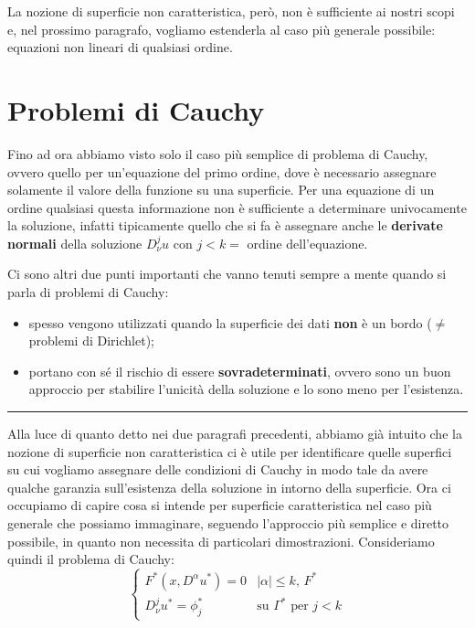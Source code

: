 La nozione di superficie non caratteristica, però, non è sufficiente ai nostri scopi e, nel prossimo paragrafo, vogliamo estenderla al caso più generale possibile: equazioni non lineari di qualsiasi ordine.

\newpage
\section{Problemi di Cauchy} \label{pb}

Fino ad ora abbiamo visto solo il caso più semplice di problema di Cauchy, ovvero quello per un'equazione del primo ordine, dove è necessario assegnare solamente il valore della funzione su una superficie. Per una equazione di un ordine qualsiasi questa informazione non è sufficiente a determinare univocamente la soluzione, infatti tipicamente quello che si fa è assegnare anche le \textbf{derivate normali} della soluzione $D^j_\nu u$ con $j<k=$ ordine dell'equazione. 

Ci sono altri due punti importanti che vanno tenuti sempre a mente quando si parla di problemi di Cauchy:
\begin{itemize}
\item spesso vengono utilizzati quando la superficie dei dati \textbf{non} è un bordo ($\neq$ problemi di Dirichlet);
\item portano con sé il rischio di essere \textbf{sovradeterminati}, ovvero sono un buon approccio per stabilire l'unicità della soluzione e lo sono meno per l'esistenza.
\end{itemize}

\noindent\rule[0.5ex]{\linewidth}{0.2pt}

Alla luce di quanto detto nei due paragrafi precedenti, abbiamo già intuito che la nozione di superficie non caratteristica ci è utile per identificare quelle superfici su cui vogliamo assegnare delle condizioni di Cauchy in modo tale da avere qualche garanzia sull'esistenza della soluzione in intorno della superficie. Ora ci occupiamo di capire cosa si intende per superficie caratteristica nel caso più generale che possiamo immaginare, seguendo l'approccio più semplice e diretto possibile, in quanto non necessita di particolari dimostrazioni.
Consideriamo quindi il problema di Cauchy:
\begin{equation}
\begin{cases}
F^*(x,D^\alpha u^*)=0 & |\alpha | \leq k, \, F^*\\
D^j_\nu u^* = \phi_j^* & \text{su } \Gamma^* \text{ per }j<k 
\end{cases}
\end{equation}

